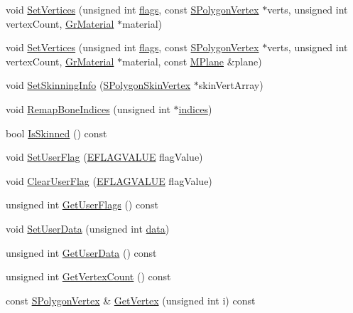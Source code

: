 \begin{CompactItemize}
\begin{CompactItemize}
\item 
void \hyperlink{class_gr_polygon_434ae06262ce8bafdf6e9a5e24ec4d28}{SetVertices} (unsigned int \hyperlink{_u_t_message_8h_0a3c0b351ab09281b662a9ff4f900a53}{flags}, const \hyperlink{struct_s_polygon_vertex}{SPolygonVertex} $\ast$verts, unsigned int vertexCount, \hyperlink{class_gr_material}{GrMaterial} $\ast$material)
\item 
void \hyperlink{class_gr_polygon_beed17aedd971fa5874537a4b68d10be}{SetVertices} (unsigned int \hyperlink{_u_t_message_8h_0a3c0b351ab09281b662a9ff4f900a53}{flags}, const \hyperlink{struct_s_polygon_vertex}{SPolygonVertex} $\ast$verts, unsigned int vertexCount, \hyperlink{class_gr_material}{GrMaterial} $\ast$material, const \hyperlink{class_m_plane}{MPlane} \&plane)
\item 
void \hyperlink{class_gr_polygon_f46dd08b01dfa7b086ef3c3ec2531d9c}{SetSkinningInfo} (\hyperlink{struct_s_polygon_skin_vertex}{SPolygonSkinVertex} $\ast$skinVertArray)
\item 
void \hyperlink{class_gr_polygon_e51b46ace5d4dfc73396033fd4858c51}{RemapBoneIndices} (unsigned int $\ast$\hyperlink{glext__bak_8h_c4293d0f76770fe857be3431df25308d}{indices})
\item 
bool \hyperlink{class_gr_polygon_16dcd5af11fdb2e6278011e06c42e2e8}{IsSkinned} () const 
\item 
void \hyperlink{class_gr_polygon_9347a0c308ea32417e30a5d5ca3fa333}{SetUserFlag} (\hyperlink{class_gr_polygon_836e951bdd2b98548ff07a856432365c}{EFLAGVALUE} flagValue)
\item 
void \hyperlink{class_gr_polygon_4e04730f82ed09021a7d6532a0bb5c80}{ClearUserFlag} (\hyperlink{class_gr_polygon_836e951bdd2b98548ff07a856432365c}{EFLAGVALUE} flagValue)
\item 
unsigned int \hyperlink{class_gr_polygon_e84a5f1368f9741416f654a6d3d6c05a}{GetUserFlags} () const 
\item 
void \hyperlink{class_gr_polygon_7d5c9c2b213b88aead8530e6ef720ff7}{SetUserData} (unsigned int \hyperlink{glext__bak_8h_69926c009f2d52c6b6d2c76784af8c64}{data})
\item 
unsigned int \hyperlink{class_gr_polygon_04b63ed7546dbcef1df9eb1ebcf19161}{GetUserData} () const 
\item 
unsigned int \hyperlink{class_gr_polygon_ef233c1659fde726aa60a1718a4ea8a4}{GetVertexCount} () const 
\item 
const \hyperlink{struct_s_polygon_vertex}{SPolygonVertex} \& \hyperlink{class_gr_polygon_5af4ec7c3b097b081a44b79f904baacd}{GetVertex} (unsigned int i) const 

\end{CompactItemize}
\end{CompactItemize}
